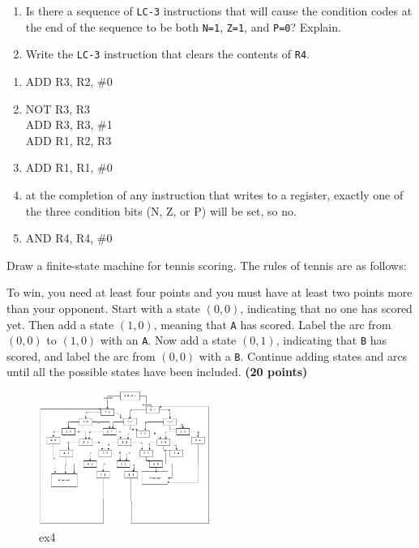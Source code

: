 \documentclass[10pt,answers]{exam}
\newcommand{\qpoints}[1]{\hfill \textbf{(#1 points)}}
\begin{document}
\begin{questions}
\begin{enumerate}[label=\alph*)]
    \item Is there a sequence of \texttt{LC-3} instructions that will cause the condition codes at the end of the sequence to be both \texttt{N=1}, \texttt{Z=1}, and \texttt{P=0}? Explain.

    \item Write the \texttt{LC-3} instruction that clears the contents of \texttt{R4}.
\end{enumerate}

\begin{solution}
    \begin{enumerate}[label=\alph*)]
		\item ADD R3, R2, \#0
	
		\item 
		NOT R3, R3 \\
		ADD R3, R3, \#1 \\
		ADD R1, R2, R3 \\
	
		\item ADD R1, R1, \#0
	
		\item at the completion of any instruction that writes to a register, exactly one of the three condition bits (N, Z, or P) will be set, so no.
	
		\item AND R4, R4, \#0
	\end{enumerate}
\end{solution}

\question Draw a finite-state machine for tennis scoring. The rules of tennis are as follows:

To win, you need at least four points and you must have at least two points more than your opponent. Start with a state \((0, 0)\), indicating that no one has scored yet. Then add a state \((1, 0)\), meaning that \texttt{A} has scored. Label the arc from \((0, 0)\) to \((1, 0)\) with an \texttt{A}. Now add a state \((0, 1)\), indicating that \texttt{B} has scored, and label the arc from \((0, 0)\) with a \texttt{B}. Continue adding states and arcs until all the possible states have been included. \qpoints{20}

\begin{solution}
    \begin{figure}[H]
		\centering
		\includegraphics[width=0.5\textwidth]{ex4.png}
		\caption{ex4}
		\label{fig:ex4}
	\end{figure}
\end{solution}


\end{questions}
\end{document}
